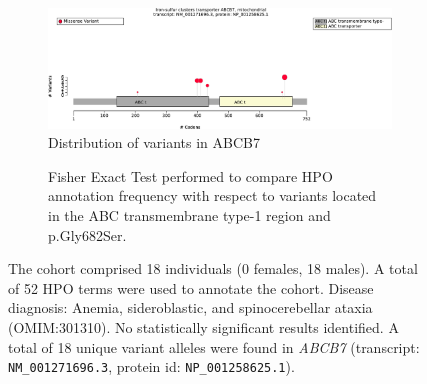 \begin{figure}[htbp]
\centering
\begin{subfigure}[b]{0.95\textwidth}
\centering
\includegraphics[width=\textwidth]{ img/ABCB7_protein_diagram.pdf} 
\captionsetup{justification=raggedright,singlelinecheck=false}
\caption{Distribution of variants in ABCB7}
\end{subfigure}

\vspace{2em}

\begin{subfigure}[b]{0.95\textwidth}
\centering
{}
\captionsetup{justification=raggedright,singlelinecheck=false}
\caption{Fisher Exact Test performed to compare HPO annotation frequency with respect to variants located in the
ABC transmembrane type-1 region and p.Gly682Ser.}
\end{subfigure}

\vspace{2em}

\caption{ The cohort comprised 18 individuals (0 females, 18 males). A total of 52 HPO terms were used to annotate the cohort. Disease diagnosis: Anemia, sideroblastic, and spinocerebellar ataxia (OMIM:301310). No statistically significant results identified. A total of 18 unique variant alleles were found in \textit{ABCB7} (transcript: \texttt{NM\_001271696.3}, protein id: \texttt{NP\_001258625.1}).}
\end{figure}
